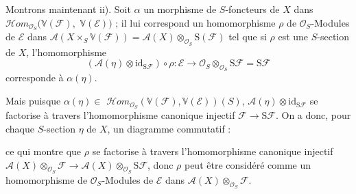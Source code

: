 \documentclass[11pt,a4paper]{article}
\begin{document}
Montrons maintenant ii). Soit $\alpha$ un morphisme de $S$-foncteurs de $X$
dans
$\mathcal{H}om_{\mathcal{O}_{S}}(\mathbb{V}(\mathcal{F}),$
$\mathbb{V}(\mathcal{E}))$ ;
il lui correspond un homomorphisme $\rho$ de $\mathcal{O}_{S}$-Modules de
$\mathcal{E}$ dans
$\mathcal{A}(X \times_{S} \mathbb{V}(\mathcal{F}))
= \mathcal{A}(X) \otimes_{\mathcal{O}_{S}} \mathrm{S}(\mathcal{F})$ tel que
si $\rho$ est une $S$-section de $X$, l'homomorphisme
\[
(\mathcal{A}(\eta) \otimes \mathrm{id}_{\mathrm{S}\mathcal{F}}) \circ \rho :
\mathcal{E} \longrightarrow
\mathcal{O}_{S} \otimes_{\mathcal{O}_{S}} \mathrm{S}\mathcal{F}
= \mathrm{S}\mathcal{F}
\]
corresponde à $\alpha(\eta)$.


Mais puisque $\alpha(\eta) \in{}$ \struck{\ill{}}
$\mathcal{H}om_{\mathcal{O}_{S}}(\mathbb{V}(\mathcal{F}), \mathbb{V}(\mathcal{E}))(S)$,
$\mathcal{A}(\eta) \otimes \mathrm{id}_{\mathrm{S}\mathcal{F}}$ se
factorise à travers l'homomorphisme canonique injectif
$\mathcal{F} \to \mathrm{S}\mathcal{F}$. On a donc, pour chaque
$S$-section $\eta$ de $X$, un diagramme commutatif :



ce qui montre que $\rho$ se factorise à travers l'homomorphisme canonique
injectif
$\mathcal{A}(X) \otimes_{\mathcal{O}_{S}} \mathcal{F} \longrightarrow
\mathcal{A}(X) \otimes_{\mathcal{O}_{S}} \mathrm{S}\mathcal{F}$, donc
$\rho$ peut être considéré comme un homomorphisme de
$\mathcal{O}_{S}$-Modules de $\mathcal{E}$ dans
$\mathcal{A}(X) \otimes_{\mathcal{O}_{S}} \mathcal{F}$.
\end{document}
